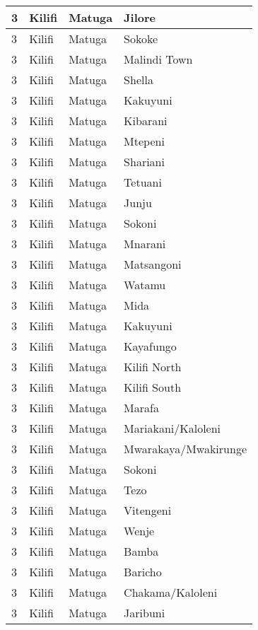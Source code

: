 \begin{table}[!ht]
\begin{tabular}{|l|l|l|l|}
        3 & Kilifi & Matuga & Jilore \\ \hline
        3 & Kilifi & Matuga & Sokoke \\ \hline
        3 & Kilifi & Matuga & Malindi Town \\ \hline
        3 & Kilifi & Matuga & Shella \\ \hline
        3 & Kilifi & Matuga & Kakuyuni \\ \hline
        3 & Kilifi & Matuga & Kibarani \\ \hline
        3 & Kilifi & Matuga & Mtepeni \\ \hline
        3 & Kilifi & Matuga & Shariani \\ \hline
        3 & Kilifi & Matuga & Tetuani \\ \hline
        3 & Kilifi & Matuga & Junju \\ \hline
        3 & Kilifi & Matuga & Sokoni \\ \hline
        3 & Kilifi & Matuga & Mnarani \\ \hline
        3 & Kilifi & Matuga & Matsangoni \\ \hline
        3 & Kilifi & Matuga & Watamu \\ \hline
        3 & Kilifi & Matuga & Mida \\ \hline
        3 & Kilifi & Matuga & Kakuyuni \\ \hline
        3 & Kilifi & Matuga & Kayafungo \\ \hline
        3 & Kilifi & Matuga & Kilifi North \\ \hline
        3 & Kilifi & Matuga & Kilifi South \\ \hline
        3 & Kilifi & Matuga & Marafa \\ \hline
        3 & Kilifi & Matuga & Mariakani/Kaloleni \\ \hline
        3 & Kilifi & Matuga & Mwarakaya/Mwakirunge \\ \hline
        3 & Kilifi & Matuga & Sokoni \\ \hline
        3 & Kilifi & Matuga & Tezo \\ \hline
        3 & Kilifi & Matuga & Vitengeni \\ \hline
        3 & Kilifi & Matuga & Wenje \\ \hline
        3 & Kilifi & Matuga & Bamba \\ \hline
        3 & Kilifi & Matuga & Baricho \\ \hline
        3 & Kilifi & Matuga & Chakama/Kaloleni \\ \hline
        3 & Kilifi & Matuga & Jaribuni \\ \hline

\end{tabular}
\end{table}
